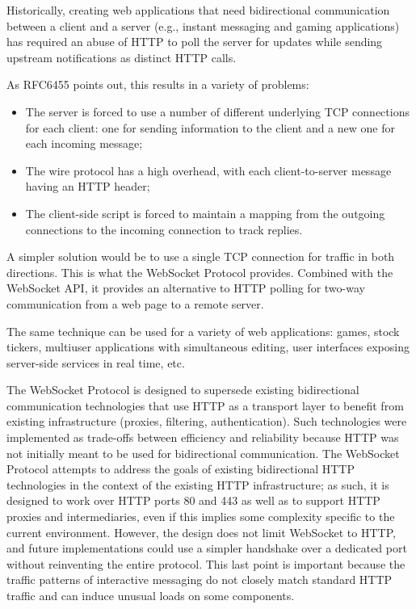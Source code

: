 Historically, creating web applications that need bidirectional communication
between a client and a server (e.g., instant messaging and gaming applications)
has required an abuse of HTTP to poll the server for updates while sending
upstream notifications as distinct HTTP calls.

As RFC6455\cite{websockets} points out, this results in a variety of problems:

\begin{itemize}

\item The server is forced to use a number of different underlying TCP
  connections for each client: one for sending information to the
  client and a new one for each incoming message;

\item The wire protocol has a high overhead, with each client-to-server
  message having an HTTP header;

\item The client-side script is forced to maintain a mapping from the
  outgoing connections to the incoming connection to track replies.

\end{itemize}

A simpler solution would be to use a single TCP connection for traffic in both
directions. This is what the WebSocket Protocol provides. Combined with the
WebSocket API, it provides an alternative to HTTP polling for two-way
communication from a web page to a remote server.

The same technique can be used for a variety of web applications: games, stock
tickers, multiuser applications with simultaneous editing, user interfaces
exposing server-side services in real time, etc.

The WebSocket Protocol is designed to supersede existing bidirectional
communication technologies that use HTTP as a transport layer to benefit from
existing infrastructure (proxies, filtering, authentication). Such technologies
were implemented as trade-offs between efficiency and reliability because HTTP
was not initially meant to be used for bidirectional communication. The
WebSocket Protocol attempts to address the goals of existing bidirectional HTTP
technologies in the context of the existing HTTP infrastructure; as such, it is
designed to work over HTTP ports 80 and 443 as well as to support HTTP proxies
and intermediaries, even if this implies some complexity specific to the current
environment. However, the design does not limit WebSocket to HTTP, and future
implementations could use a simpler handshake over a dedicated port without
reinventing the entire protocol. This last point is important because the
traffic patterns of interactive messaging do not closely match standard HTTP
traffic and can induce unusual loads on some components.

